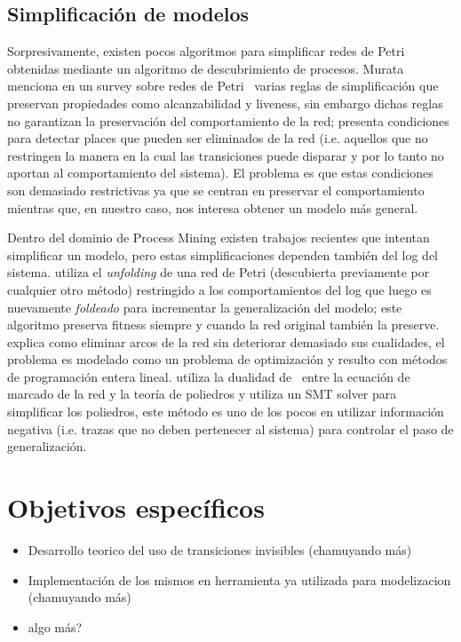 \documentclass{llncs}
\begin{document}
\subsection{Simplificación de modelos}
 
Sorpresivamente, existen pocos algoritmos para simplificar redes de Petri obtenidas mediante un algoritmo de descubrimiento de procesos. Murata menciona en un survey sobre redes de Petri~\cite{murata} varias reglas de simplificación que preservan propiedades como alcanzabilidad y liveness, sin embargo dichas reglas no garantizan la preservación del comportamiento de la red; \cite{ColomS89a} presenta condiciones para detectar places que pueden ser eliminados de la red (i.e. aquellos que no restringen la manera en la cual las transiciones puede disparar y por lo tanto no aportan al comportamiento del sistema). El problema es que estas condiciones son demasiado restrictivas ya que se centran en preservar el comportamiento mientras que, en nuestro caso, nos interesa obtener un modelo más general.

Dentro del dominio de Process Mining existen trabajos recientes que intentan simplificar un modelo, pero estas simplificaciones dependen también del log del sistema. \cite{FahlandA11} utiliza el \textit{unfolding} de una red de Petri (descubierta previamente por cualquier otro método) restringido a los comportamientos del log que luego es nuevamente \textit{foldeado} para incrementar la generalización del modelo; este algoritmo preserva fitness siempre y cuando la red original también la preserve. \cite{BPM152} explica como eliminar arcos de la red sin deteriorar demasiado sus cualidades, el problema es modelado como un problema de optimización y resulto con métodos de programación entera lineal. \cite{BPM15} utiliza la dualidad de~\cite{CarmonaC14} entre la ecuación de marcado de la red y la teoría de poliedros y utiliza un SMT solver para simplificar los poliedros, este método es uno de los pocos en utilizar información negativa (i.e. trazas que no deben pertenecer al sistema) para controlar el paso de generalización.

\fi

\section{Objetivos específicos}

\begin{itemize}
\item Desarrollo teorico del uso de transiciones invisibles (chamuyando más)
\item Implementación de los mismos en herramienta ya utilizada para modelizacion (chamuyando más)
\item algo más?
\end{itemize}
\end{document}
